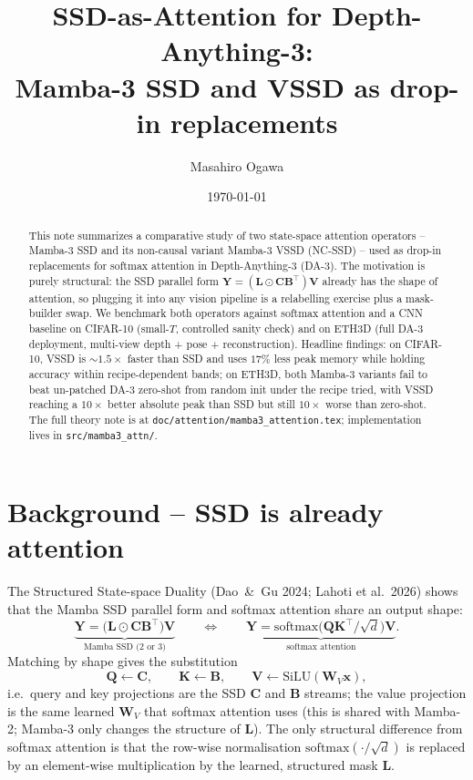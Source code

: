 \documentclass[11pt,a4paper]{article}
\title{SSD-as-Attention for Depth-Anything-3:\\
       Mamba-3 SSD and VSSD as drop-in replacements}
\author{Masahiro Ogawa}
\date{\today}
\begin{document}
\maketitle

\begin{abstract}
This note summarizes a comparative study of two state-space attention
operators -- Mamba-3 SSD and its non-causal variant Mamba-3 VSSD (NC-SSD)
-- used as drop-in replacements for softmax attention in Depth-Anything-3
(DA-3). The motivation is purely structural: the SSD parallel form
$\bm{Y} = (\bm{L}\odot\bm{C}\bm{B}^\top)\bm{V}$ already has the shape of
attention, so plugging it into any vision pipeline is a relabelling
exercise plus a mask-builder swap. We benchmark both operators against
softmax attention and a CNN baseline on CIFAR-10 (small-$T$, controlled
sanity check) and on ETH3D (full DA-3 deployment, multi-view depth +
pose + reconstruction). Headline findings: on CIFAR-10, VSSD is
$\sim 1.5\times$ faster than SSD and uses $17\%$ less peak memory while
holding accuracy within recipe-dependent bands; on ETH3D, both
Mamba-3 variants fail to beat un-patched DA-3 zero-shot from random
init under the recipe tried, with VSSD reaching a $10\times$ better
absolute peak than SSD but still $10\times$ worse than zero-shot.
The full theory note is at \texttt{doc/attention/mamba3\_attention.tex};
implementation lives in \texttt{src/mamba3\_attn/}.
\end{abstract}

\tableofcontents

\section{Background -- SSD is already attention}

The Structured State-space Duality (Dao~\&~Gu 2024; Lahoti et al.\
2026) shows that the Mamba SSD parallel form and softmax attention
share an output shape:
\begin{equation}\label{eq:duality}
  \underbrace{\bm{Y} = \bigl(\bm{L}\odot\bm{C}\bm{B}^\top\bigr)\bm{V}}_{\text{Mamba SSD (2 or 3)}}
  \qquad\Longleftrightarrow\qquad
  \underbrace{\bm{Y} = \mathrm{softmax}\!\bigl(\bm{Q}\bm{K}^\top/\sqrt{d}\bigr)\bm{V}}_{\text{softmax attention}}.
\end{equation}
Matching by shape gives the substitution
\[
  \bm{Q} \leftarrow \bm{C},\qquad
  \bm{K} \leftarrow \bm{B},\qquad
  \bm{V} \leftarrow \mathrm{SiLU}(\bm{W}_V\bm{x}),
\]
i.e.\ query and key projections are the SSD $\bm{C}$ and $\bm{B}$
streams; the value projection is the same learned $\bm{W}_V$ that
softmax attention uses (this is shared with Mamba-2; Mamba-3 only
changes the structure of $\bm{L}$). The only structural difference
from softmax attention is that the row-wise normalisation
$\mathrm{softmax}(\cdot/\sqrt{d})$ is replaced by an element-wise
multiplication by the learned, structured mask $\bm{L}$.
\end{document}
